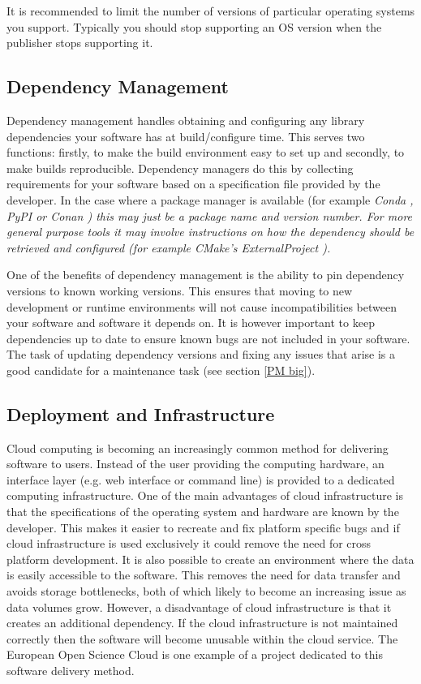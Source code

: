 \documentclass[jnr]{iosart2x}
\begin{document}
It is recommended to limit the number of versions of particular operating systems you support.
Typically you should stop supporting an OS version when the publisher stops supporting it.

\subsection{Dependency Management}
\label{Dependency Management}

Dependency management handles obtaining and configuring any library dependencies your software has at build/configure time.
This serves two functions: firstly, to make the build environment easy to set up and secondly, to make builds reproducible.
Dependency managers do this by collecting requirements for your software based on a specification file provided by the developer.
In the case where a package manager is available (for example \it Conda \cite{Conda}, \it PyPI \cite{PyPI} or \it Conan \cite{Conan}) this may just be a package name and version number.
For more general purpose tools it may involve instructions on how the dependency should be retrieved and configured (for example \it CMake's ExternalProject \cite{CMake_ExternalProject}).

One of the benefits of dependency management is the ability to pin dependency versions to known working versions.
This ensures that moving to new development or runtime environments will not cause incompatibilities between your software and software it depends on.
It is however important to keep dependencies up to date to ensure known bugs are not included in your software.
The task of updating dependency versions and fixing any issues that arise is a good candidate for a maintenance task (see section \ref{PM big}).

\subsection{Deployment and Infrastructure}
\label{Infrastructure}

Cloud computing is becoming an increasingly common method for delivering software to users.
Instead of the user providing the computing hardware, an interface layer (e.g. web interface or command line) is provided to a dedicated computing infrastructure.
One of the main advantages of cloud infrastructure is that the specifications of the operating system and hardware are known by the developer.
This makes it easier to recreate and fix platform specific bugs and if cloud infrastructure is used exclusively it could remove the need for cross platform development.
It is also possible to create an environment where the data is easily accessible to the software.
This removes the need for data transfer and avoids storage bottlenecks, both of which likely to become an increasing issue as data volumes grow.
However, a disadvantage of cloud infrastructure is that it creates an additional dependency.
If the cloud infrastructure is not maintained correctly then the software will become unusable within the cloud service.
The European Open Science Cloud \cite{EOSC} is one example of a project dedicated to this software delivery method.
\end{document}
